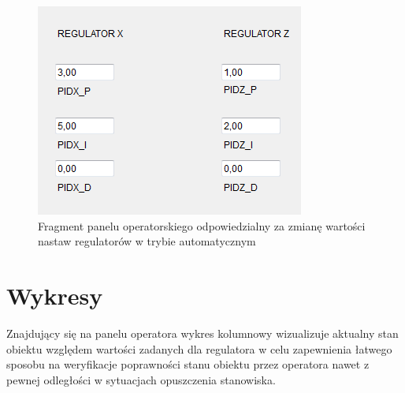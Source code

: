 \documentclass{mwrep}
\begin{document}
\begin{figure}[H]
    \label{MAPS::PanelOperatorski}
    \centering
    \includegraphics[scale=0.8]{nastawy.png}
    \caption{Fragment panelu operatorskiego odpowiedzialny za zmianę wartości nastaw regulatorów w trybie automatycznym }
\end{figure}


\section{Wykresy}
\label{MAPS::Wykresy}

Znajdujący się na panelu operatora wykres kolumnowy wizualizuje aktualny stan obiektu względem wartości zadanych dla regulatora w celu zapewnienia łatwego sposobu na weryfikacje poprawności stanu obiektu przez operatora nawet z pewnej odległości w sytuacjach opuszczenia stanowiska. 
\end{document}
